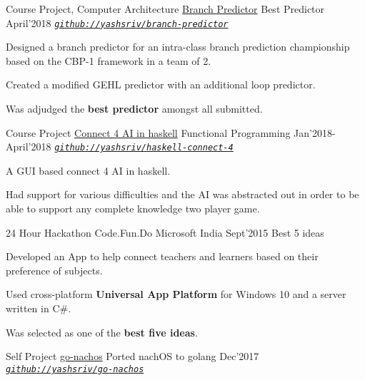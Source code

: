 \begin{cventries}
  \smallcventry
  {Course Project, Computer Architecture}
  {\href{https://github.com/yashsriv/branch-predictor/blob/master/report/main.pdf}{Branch Predictor}}
  {Best Predictor}
  {April'2018}
  {\emph{\texttt{\href{https://github.com/yashsriv/branch-predictor/blob/master/report/main.pdf}{github://yashsriv/branch-predictor}}}}
  {
    \begin{cvitems}
    \item Designed a branch predictor for an intra-class branch prediction
      championship based on the CBP-1 framework in a team of 2.
    \item Created a modified GEHL predictor with an additional loop predictor.
    \item Was adjudged the \textbf{best predictor} amongst all submitted.
    \end{cvitems}
  }

  \smallcventry
  {Course Project}
  {\href{https://github.com/yashsriv/haskell-connect-4}{Connect 4 AI in haskell}}
  {Functional Programming}
  {Jan'2018-April'2018}
  {\emph{\texttt{\href{https://github.com/yashsriv/haskell-connect-4}{github://yashsriv/haskell-connect-4}}}}
  {
    \begin{cvitems}
    \item A GUI based connect 4 AI in haskell.
    \item Had support for various difficulties and the AI was abstracted out in
      order to be able to support any complete knowledge two player game.
    \end{cvitems}
  }

  \smallcventry
  {24 Hour Hackathon}
  {Code.Fun.Do}
  {Microsoft India}
  {Sept'2015}
  {Best 5 ideas}
  {
    \begin{cvitems}
    \item Developed an App to help connect teachers and learners based on their
      preference of subjects.
    \item Used cross-platform \textbf{Universal App Platform} for Windows 10
      and a server written in C\#.
    \item Was selected as one of the \textbf{best five ideas}.
    \end{cvitems}
  }

  \smallcventry
  {Self Project}
  {\href{https://github.com/yashsriv/go-nachos}{go-nachos}}
  {Ported nachOS to golang}
  {Dec'2017}
  {\emph{\texttt{\href{https://github.com/yashsriv/go-nachos}{github://yashsriv/go-nachos}}}}
  {}

\end{cventries}
\vspace{-2mm}

